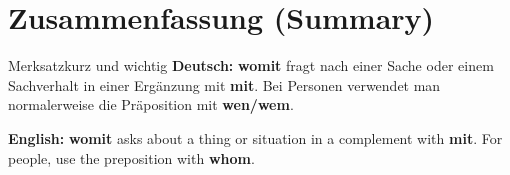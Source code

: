 \documentclass[a4paper,11pt]{article}
\newcommand{\GermanText}[1]{\textbf{Deutsch: }#1\par}
\newcommand{\EnglishText}[1]{{\small\color{SoftGray}\textbf{English: }#1\par}}
\begin{document}
\section{Zusammenfassung (Summary)}
\begin{grammarentry}{Merksatz}{kurz und wichtig}
\GermanText{\textbf{womit} fragt nach einer Sache oder einem Sachverhalt in einer Ergänzung mit \textbf{mit}. Bei Personen verwendet man normalerweise die Präposition mit \textbf{wen/wem}.}
\EnglishText{\textbf{womit} asks about a thing or situation in a complement with \textbf{mit}. For people, use the preposition with \textbf{whom}.}
\end{grammarentry}
\end{document}
